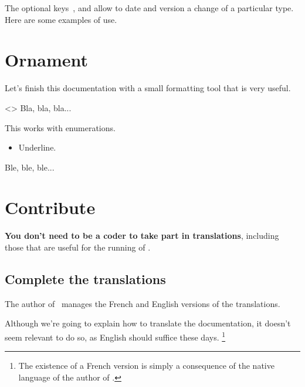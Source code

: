 The optional keys \,,  and  allow to date and version a change of a particular type.
Here are some examples of use.




\section{Ornament}

Let's finish this documentation with a small formatting tool that is very useful.


\begin{tdoclatex}<>
Bla, bla, bla...

\tdocsep %

This works with enumerations.

\begin{itemize}
    \item Underline.
\end{itemize}

\tdocsep %

Ble, ble, ble...
\end{tdoclatex}


\section{Contribute}

\begin{tdocnote}
    \textbf{You don't need to be a coder to take part in translations}, including those that are useful for the running of \thisproj.
\end{tdocnote}



\subsection{Complete the translations}

\begin{tdocnote}
    The author of \thisproj\ manages the French and English versions of the translations.
\end{tdocnote}


\begin{tdoccaut}
    Although we're going to explain how to translate the documentation, it doesn't seem relevant to do so, as English should suffice these days.%
    \footnote{
      The existence of a French version is simply a consequence of the native language of the author of \thisproj.
    }
\end{tdoccaut}


